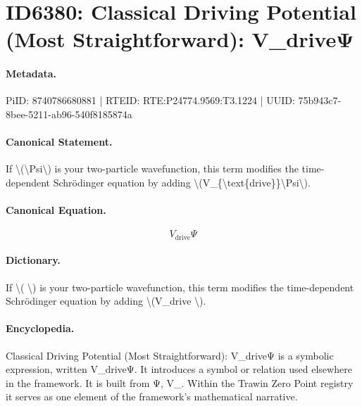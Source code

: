 \section*{ID6380: Classical Driving Potential (Most Straightforward): V\_driveΨ}
\paragraph{Metadata.}
PiID: 8740786680881 | RTEID: RTE:P24774.9569:T3.1224 | UUID: 75b943c7-8bee-5211-ab96-540f8185874a

\paragraph{Canonical Statement.}
If \textbackslash{}(\textbackslash{}Psi\textbackslash{}) is your two-particle wavefunction, this term modifies the time-dependent Schrödinger equation by adding \textbackslash{}(V\_\{\textbackslash{}text\{drive\}\}\textbackslash{}Psi\textbackslash{}).

\paragraph{Canonical Equation.}
\[
V_{\text{drive}}\Psi
\]

\paragraph{Dictionary.}
If \textbackslash{}( \textbackslash{}) is your two-particle wavefunction, this term modifies the time-dependent Schrödinger equation by adding \textbackslash{}(V\_drive \textbackslash{}).

\paragraph{Encyclopedia.}
Classical Driving Potential (Most Straightforward): V\_driveΨ is a symbolic expression, written V\_driveΨ. It introduces a symbol or relation used elsewhere in the framework. It is built from Ψ, V\_. Within the Trawin Zero Point registry it serves as one element of the framework's mathematical narrative.
